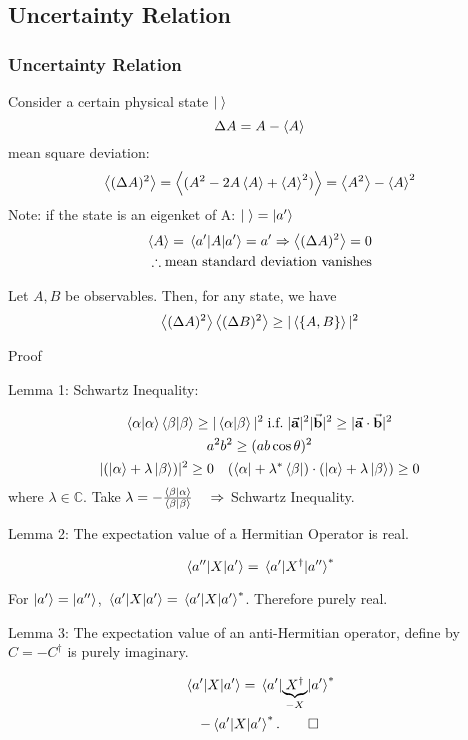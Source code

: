 \subsection{Uncertainty Relation}
\begin{frame}
	\frametitle{Uncertainty Relation}
	Consider a certain physical state $\ket{\;}$\\
	\[\Delta A = A - \ev{A}\]
	mean square deviation:
	\[
		\ev{(\Delta A)^2} = \ev{ (A^2 - 2A \ev{A} + \ev{A}^2 ) } = \ev{A^2} - \ev{A}^2
	\]
	Note: if the state is an eigenket of A: $\ket{\;} = \ket{a'}$
	\[\begin{split}
			\ev{A} = \mel{a'}{A}{a'} = a' \Rightarrow \ev{(\Delta A)^2} = 0 \\ \therefore \text{mean standard deviation vanishes}
		\end{split}
	\]
\end{frame}
\begin{frame}
	\begin{theorem}
		Let $A,B$ be observables. Then, for any state, we have
		\[
			\ev{(\Delta A)^2}\ev{(\Delta B)^2} \ge |\ev{\acomm{A}{B}}|^2
		\]
	\end{theorem}
	Proof

	Lemma 1: Schwartz Inequality:

	\begin{gather*}
		\ip{\alpha} \ip{\beta} \ge |\ip{\alpha}{\beta}|^2 \; \text{i.f.} \; |\va a|^2 |\va b|^2 \ge  |\va a \cdot \va b|^2\\
		a^2 b^2 \ge (ab \cos{\theta})^2\\
		|(\ket \alpha + \lambda \ket \beta)|^2 \ge 0  \quad (\bra{\alpha} + \lambda^* \bra \beta) \cdot (\ket \alpha + \lambda \ket \beta) \ge 0
	\end{gather*}
	where $\lambda \in \mathbb{C}$. Take $\lambda = -\frac{\ip{\beta}{\alpha}}{\ip{\beta}{\beta}} \quad \Rightarrow$ Schwartz Inequality.
\end{frame}
\begin{frame}
	Lemma 2: The expectation value of a Hermitian Operator is real.

	\[
		\mel{a''}{X}{a'} = \mel{a'}{X^\dag}{a''}^*
	\]

	For $\ket{a'} = \ket{a''}$, $\mel{a'}{X}{a'} = \mel{a'}{X}{a'}^*$. Therefore purely real.

	\vfill

	Lemma 3: The expectation value of an anti-Hermitian operator, define by $C=-C^\dag$ is purely imaginary.

	\begin{gather*}
		\mel{a'}{X}{a'} = \mel{a'}{\underbrace{X^\dag}_{-X}}{a'}^*\\
		-\mel{a'}{X}{a'}^*. \qed
	\end{gather*}
\end{frame}

